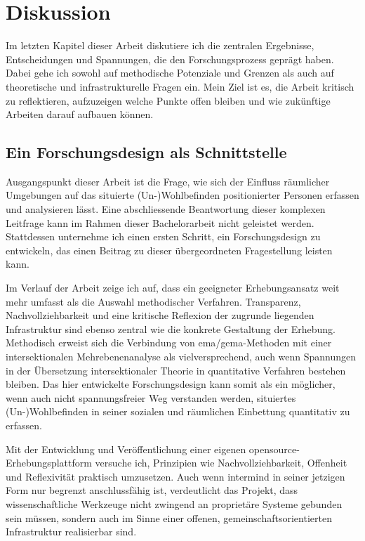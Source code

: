 \chapter{Diskussion} \label{sec:diskussion}

Im letzten Kapitel dieser Arbeit diskutiere ich die zentralen Ergebnisse, Entscheidungen und Spannungen, die den Forschungsprozess geprägt haben. Dabei gehe ich sowohl auf methodische Potenziale und Grenzen als auch auf theoretische und infrastrukturelle Fragen ein. Mein Ziel ist es, die Arbeit kritisch zu reflektieren, aufzuzeigen welche Punkte offen bleiben und wie zukünftige Arbeiten darauf aufbauen können.

\section{Ein Forschungsdesign als Schnittstelle}

Ausgangspunkt dieser Arbeit ist die Frage, wie sich der Einfluss räumlicher Umgebungen auf das situierte (Un\nobreakdash-)Wohlbefinden  positionierter Personen erfassen und analysieren lässt. Eine abschliessende Beantwortung dieser komplexen Leitfrage kann im Rahmen dieser Bachelorarbeit nicht geleistet werden. Stattdessen unternehme ich einen ersten Schritt, ein Forschungsdesign zu entwickeln, das einen Beitrag zu dieser übergeordneten Fragestellung leisten kann.

Im Verlauf der Arbeit zeige ich auf, dass ein geeigneter Erhebungsansatz weit mehr umfasst als die Auswahl methodischer Verfahren. Transparenz, Nachvollziehbarkeit und eine kritische Reflexion der zugrunde liegenden Infrastruktur sind ebenso zentral wie die konkrete Gestaltung der Erhebung. Methodisch erweist sich die Verbindung von \gls{ema}/\gls{gema}-Methoden mit einer intersektionalen Mehrebenenanalyse als vielversprechend, auch wenn Spannungen in der Übersetzung intersektionaler Theorie in quantitative Verfahren bestehen bleiben. Das hier entwickelte Forschungsdesign kann somit als ein möglicher, wenn auch nicht spannungsfreier Weg verstanden werden, situiertes (Un\nobreakdash-)Wohlbefinden in seiner sozialen und räumlichen Einbettung quantitativ zu erfassen.

Mit der Entwicklung und Veröffentlichung einer eigenen \gls{opensource}-Erhebungsplattform versuche ich, Prinzipien wie Nachvollziehbarkeit, Offenheit und Reflexivität praktisch umzusetzen. Auch wenn \gls{intermind} in seiner jetzigen Form nur begrenzt anschlussfähig ist, verdeutlicht das Projekt, dass wissenschaftliche Werkzeuge nicht zwingend an proprietäre Systeme gebunden sein müssen, sondern auch im Sinne einer offenen, gemeinschaftsorientierten Infrastruktur realisierbar sind.

